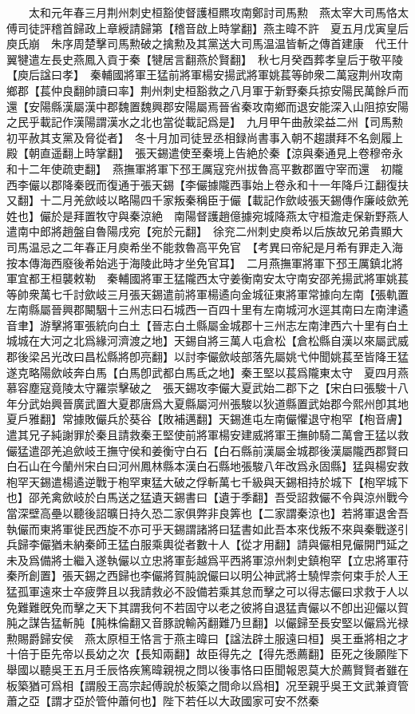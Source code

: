 　　太和元年春三月荆州刺史桓豁使督護桓羆攻南鄭討司馬勲　燕太宰大司馬恪太傅司徒評稽首歸政上章綬請歸第【稽音啟上時掌翻】燕主暐不許　夏五月戊寅皇后庾氏崩　朱序周楚擊司馬勲破之擒勲及其黨送大司馬温温皆斬之傳首建康　代王什翼犍遣左長史燕鳳入貢于秦【犍居言翻燕於賢翻】　秋七月癸酉葬孝皇后于敬平陵【庾后諡曰孝】　秦輔國將軍王猛前將軍楊安揚武將軍姚萇等帥衆二萬宼荆州攻南鄉郡【萇仲良翻帥讀曰率】荆州刺史桓豁救之八月軍于新野秦兵掠安陽民萬餘戶而還【安陽縣漢屬漢中郡魏置魏興郡安陽屬焉晉省秦攻南鄉而退安能深入山阻掠安陽之民乎載記作漢陽謂漢水之北也當從載記爲是】　九月甲午曲赦梁益二州【司馬勲初平赦其支黨及脅從者】　冬十月加司徒昱丞相録尚書事入朝不趨讃拜不名劍履上殿【朝直遥翻上時掌翻】　張天錫遣使至秦境上告絶於秦【涼與秦通見上卷穆帝永和十二年使疏吏翻】　燕撫軍將軍下邳王厲寇兖州拔魯高平數郡置守宰而還　初隴西李儼以郡降秦旣而復通于張天錫【李儼據隴西事始上卷永和十一年降戶江翻復扶又翻】十二月羌歛岐以略陽四千家叛秦稱臣于儼【載記作歛岐張天錫傳作廉岐歛羌姓也】儼於是拜置牧守與秦涼絶　南陽督護趙億據宛城降燕太守桓澹走保新野燕人遣南中郎將趙盤自魯陽戌宛【宛於元翻】　徐兖二州刺史庾希以后族故兄弟貴顯大司馬温忌之二年春正月庾希坐不能救魯高平免官　【考異曰帝紀是月希有罪走入海按本傳海西廢後希始逃于海陵此時才坐免官耳】　二月燕撫軍將軍下邳王厲鎮北將軍宜都王桓襲敕勒　秦輔國將軍王猛隴西太守姜衡南安太守南安邵羌揚武將軍姚萇等帥衆萬七千討歛岐三月張天錫遣前將軍楊遹向金城征東將軍常據向左南【張軌置左南縣屬晉興郡闞駰十三州志曰石城西一百四十里有左南城河水逕其南曰左南津遹音聿】游擊將軍張統向白土【晉志白土縣屬金城郡十三州志左南津西六十里有白土城城在大河之北爲緣河濟渡之地】天錫自將三萬人屯倉松【倉松縣自漢以來屬武威郡後梁呂光改曰昌松縣將卽亮翻】以討李儼歛岐部落先屬姚弋仲聞姚萇至皆降王猛遂克略陽歛岐奔白馬【白馬卽武都白馬氐之地】秦王堅以萇爲隴東太守　夏四月燕慕容塵寇竟陵太守羅崇擊破之　張天錫攻李儼大夏武始二郡下之【宋白曰張駿十八年分武始興晉廣武置大夏郡唐爲大夏縣屬河州張駿以狄道縣置武始郡今熙州卽其地夏戶雅翻】常據敗儼兵於葵谷【敗補邁翻】天錫進屯左南儼懼退守枹罕【枹音膚】遣其兄子純謝罪於秦且請救秦王堅使前將軍楊安建威將軍王撫帥騎二萬會王猛以救儼猛遣邵羌追歛岐王撫守侯和姜衡守白石【白石縣前漢屬金城郡後漢屬隴西郡賢曰白石山在今蘭州宋白曰河州鳳林縣本漢白石縣地張駿八年改爲永固縣】猛與楊安救枹罕天錫遣楊遹逆戰于枹罕東猛大破之俘斬萬七千級與天錫相持於城下【枹罕城下也】邵羌禽歛岐於白馬送之猛遺天錫書曰【遺于季翻】吾受詔救儼不令與涼州戰今當深壁高壘以聽後詔曠日持久恐二家俱弊非良筭也【二家謂秦涼也】若將軍退舍吾執儼而東將軍徙民西旋不亦可乎天錫謂諸將曰猛書如此吾本來伐叛不來與秦戰遂引兵歸李儼猶未納秦師王猛白服乘輿從者數十人【從才用翻】請與儼相見儼開門延之未及爲備將士繼入遂執儼以立忠將軍彭越爲平西將軍涼州刺史鎮枹罕【立忠將軍苻秦所創置】張天錫之西歸也李儼將賀肫說儼曰以明公神武將士驍悍柰何束手於人王猛孤軍遠來士卒疲弊且以我請救必不設備若乘其怠而擊之可以得志儼曰求救于人以免難難旣免而擊之天下其謂我何不若固守以老之彼將自退猛責儼以不卽出迎儼以賀肫之謀告猛斬肫【肫株倫翻又音豚說輸芮翻難乃旦翻】以儼歸至長安堅以儼爲光禄勲賜爵歸安侯　燕太原桓王恪言于燕主暐曰【諡法辟土服遠曰桓】吳王垂將相之才十倍于臣先帝以長幼之次【長知兩翻】故臣得先之【得先悉薦翻】臣死之後願陛下舉國以聽吳王五月壬辰恪疾篤暐親視之問以後事恪曰臣聞報恩莫大於薦賢賢者雖在板築猶可爲相【謂殷王高宗起傅說於板築之間命以爲相】况至親乎吳王文武兼資管蕭之亞【謂才亞於管仲蕭何也】陛下若任以大政國家可安不然秦